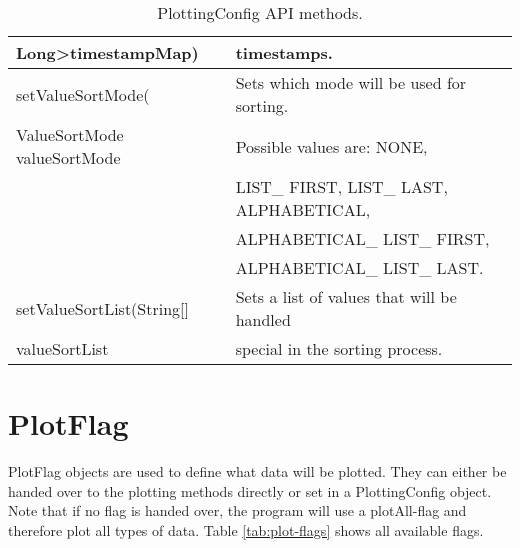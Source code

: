 \begin{table}[h]
\begin{tabular}[h]{|l|l|}
	Long\textgreater  timestampMap) & timestamps.\\
	\hline
	setValueSortMode( & Sets which mode will be used for sorting.\\
	ValueSortMode valueSortMode & Possible values are: NONE,\\
	& LIST\_ FIRST, LIST\_ LAST, ALPHABETICAL,\\
	& ALPHABETICAL\_ LIST\_ FIRST,\\
	& ALPHABETICAL\_ LIST\_ LAST.\\
	\hline
	setValueSortList(String[] & Sets a list of values that will be handled\\
	valueSortList & special in the sorting process.\\
	\hline
\end{tabular}
\caption{PlottingConfig API methods.}
\label{tab:plot-methods}
\end{table}

\section{PlotFlag}
PlotFlag objects are used to define what data will be plotted. They can either be handed over to the plotting methods directly or set in a PlottingConfig object. Note that if no flag is handed over, the program will use a plotAll-flag and therefore plot all types of data. Table \ref{tab:plot-flags} shows all available flags.

